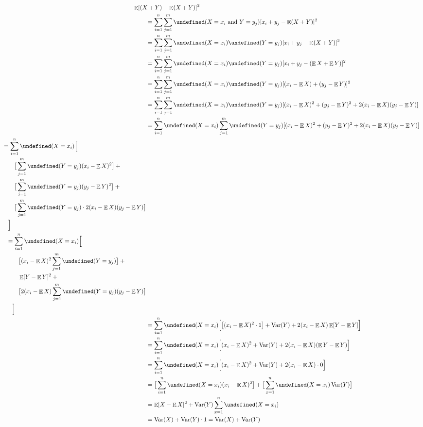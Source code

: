 \documentclass{article}
\let\P\undefined
\DeclareMathOperator\P{\mathbb{P}}
\DeclareMathOperator\E{\mathbb{E}}
\DeclareMathOperator\Var{Var}
\begin{document}
\begin{enumerate}
\begin{align*}
\mathrlap{\E[(X + Y) - \E(X + Y)]^{2}}\qquad &\\
&= \sum_{i = 1}^{n} \sum_{j = 1}^{m} \P(X = x_{i}\text{ and }Y = y_{j})[x_{i} + y_{j} - \E(X + Y)]^{2}\\
&= \sum_{i = 1}^{n} \sum_{j = 1}^{m} \P(X = x_{i}) \P(Y = y_{j}) [x_{i} + y_{j} - \E(X + Y)]^{2}\\
&= \sum_{i = 1}^{n} \sum_{j = 1}^{m} \P(X = x_{i}) \P(Y = y_{j}) [x_{i} + y_{j} - (\E X + \E Y)]^{2}\\
&= \sum_{i = 1}^{n} \sum_{j = 1}^{m} \P(X = x_{i}) \P(Y = y_{j}) [(x_{i} - \E X) + (y_{j} - \E Y)]^{2}\\
&= \sum_{i = 1}^{n} \sum_{j = 1}^{m} \P(X = x_{i}) \P(Y = y_{j}) [(x_{i} - \E X)^{2} + (y_{j} - \E Y)^{2} + 2(x_{i} - \E X)(y_{j} - \E Y)]\\
&= \sum_{i = 1}^{n} \P(X = x_{i}) \sum_{j = 1}^{m} \P(Y = y_{j}) [(x_{i} - \E X)^{2} + (y_{j} - \E Y)^{2} + 2(x_{i} - \E X)(y_{j} - \E Y)]\\
\begin{split}
&= \sum_{i = 1}^{n} \P(X = x_{i}) \Big[\\
&\qquad \big[\sum_{j = 1}^{m} \P(Y = y_{j})(x_{i} - \E X)^{2}\big] + {}\\
&\qquad \big[\sum_{j = 1}^{m}\P(Y = y_{j}) (y_{j} - \E Y)^{2}\big] + {}\\
&\qquad \big[\sum_{j = 1}^{m}\P(Y = y_{j}) \cdot 2(x_{i} - \E X)(y_{j} - \E Y)\big]\\
&\quad \Big]
\end{split}\\
\begin{split}
&= \sum_{i = 1}^{n} \P(X = x_{i}) \Big[\\
&\qquad \big[(x_{i} - \E X)^{2}\sum_{j = 1}^{m} \P(Y = y_{j})\big] + {}\\
&\qquad \E[Y - \E Y]^{2} + {}\\
&\qquad \big[2(x_{i} - \E X)\sum_{j = 1}^{m}\P(Y = y_{j})(y_{j} - \E Y)\big]\\
&\quad \Big]
\end{split}\\
&= \sum_{i = 1}^{n} \P(X = x_{i}) \Big[
\big[(x_{i} - \E X)^{2} \cdot 1\big] +
\Var(Y) +
2(x_{i} - \E X) \E[Y - \E Y]\Big]\\
&= \sum_{i = 1}^{n} \P(X = x_{i}) \Big[(x_{i} - \E X)^{2} + \Var(Y) + 2(x_{i} - \E X)(\E Y - \E Y)\Big]\\
&= \sum_{i = 1}^{n} \P(X = x_{i}) \Big[(x_{i} - \E X)^{2} + \Var(Y) + 2(x_{i} - \E X) \cdot 0\Big]\\
&= \big[\sum_{i = 1}^{n} \P(X = x_{i})(x_{i} - \E X)^{2}\big] + \big[\sum_{x = 1}^{n}\P(X = x_{i}) \Var(Y)\big]\\
&= \E[X - \E X]^{2} + \Var(Y)\sum_{x = 1}^{n}\P(X = x_{i})\\
&= \Var(X) + \Var(Y) \cdot 1
= \Var(X) + \Var(Y)
\end{align*}
\end{enumerate}
\end{document}
